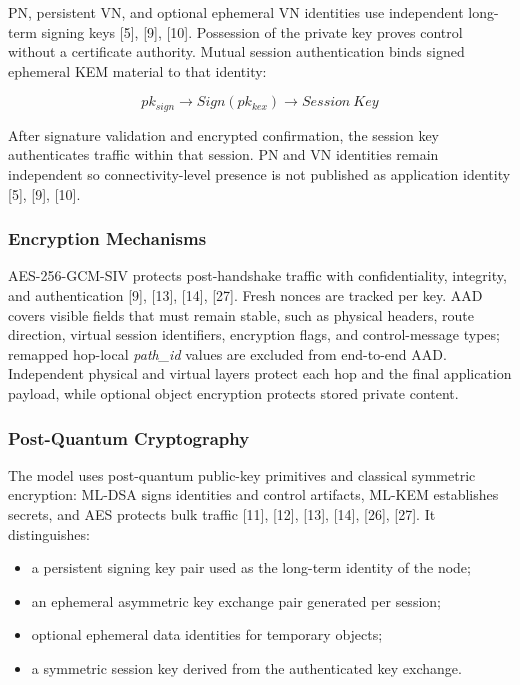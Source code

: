 \documentclass[12pt]{article}
\begin{document}
PN, persistent VN, and optional ephemeral VN identities use independent long-term signing keys [5], [9], [10]. Possession of the private key proves control without a certificate authority. Mutual session authentication binds signed ephemeral KEM material to that identity:

\[
pk_{sign} \rightarrow Sign(pk_{kex}) \rightarrow Session\ Key
\]

After signature validation and encrypted confirmation, the session key authenticates traffic within that session. PN and VN identities remain independent so connectivity-level presence is not published as application identity [5], [9], [10].

\subsubsection{Encryption Mechanisms}

AES-256-GCM-SIV protects post-handshake traffic with confidentiality, integrity, and authentication [9], [13], [14], [27]. Fresh nonces are tracked per key. AAD covers visible fields that must remain stable, such as physical headers, route direction, virtual session identifiers, encryption flags, and control-message types; remapped hop-local \textit{path\_id} values are excluded from end-to-end AAD. Independent physical and virtual layers protect each hop and the final application payload, while optional object encryption protects stored private content.

\subsubsection{Post-Quantum Cryptography}

The model uses post-quantum public-key primitives and classical symmetric encryption: ML-DSA signs identities and control artifacts, ML-KEM establishes secrets, and AES protects bulk traffic [11], [12], [13], [14], [26], [27]. It distinguishes:

\begin{itemize}
    \item a persistent signing key pair used as the long-term identity of the node;
    \item an ephemeral asymmetric key exchange pair generated per session;
    \item optional ephemeral data identities for temporary objects;
    \item a symmetric session key derived from the authenticated key exchange.
\end{itemize}
\end{document}
